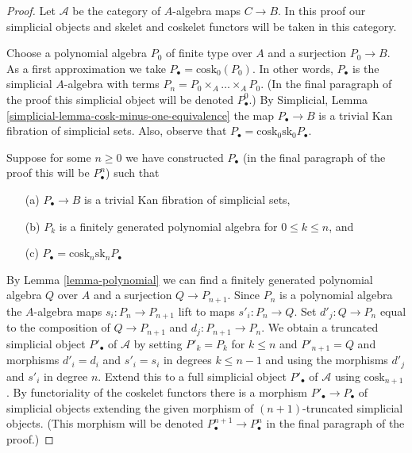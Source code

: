 \begin{proof}
Let $\mathcal{A}$ be the category of $A$-algebra maps $C \to B$.
In this proof our simplicial objects and skelet and coskelet
functors will be taken in this category.

\medskip\noindent
Choose a polynomial algebra $P_0$ of finite type over $A$ and a surjection
$P_0 \to B$. As a first approximation we take
$P_\bullet = \text{cosk}_0(P_0)$. In other words, $P_\bullet$ is the simplicial
$A$-algebra with terms $P_n = P_0 \times_A \ldots \times_A P_0$.
(In the final paragraph of the proof this simplicial object will
be denoted $P^0_\bullet$.) By
Simplicial, Lemma \ref{simplicial-lemma-cosk-minus-one-equivalence}
the map $P_\bullet \to B$ is a trivial Kan fibration of simplicial sets.
Also, observe that $P_\bullet = \text{cosk}_0 \text{sk}_0 P_\bullet$.

\medskip\noindent
Suppose for some $n \geq 0$ we have constructed $P_\bullet$
(in the final paragraph of the proof this will be $P^n_\bullet$)
such that
\begin{enumerate}
\item[(a)] $P_\bullet \to B$ is a trivial Kan fibration of simplicial sets,
\item[(b)] $P_k$ is a finitely generated polynomial algebra for
$0 \leq k \leq n$, and
\item[(c)] $P_\bullet = \text{cosk}_n \text{sk}_n P_\bullet$
\end{enumerate}
By Lemma \ref{lemma-polynomial}
we can find a finitely generated polynomial algebra $Q$ over $A$
and a surjection $Q \to P_{n + 1}$. Since $P_n$ is a polynomial algebra
the $A$-algebra maps $s_i : P_n \to P_{n + 1}$ lift to maps
$s'_i : P_n \to Q$. Set $d'_j : Q \to P_n$ equal to the composition of
$Q \to P_{n + 1}$ and $d_j : P_{n + 1} \to P_n$.
We obtain a truncated simplicial object $P'_\bullet$ of $\mathcal{A}$
by setting $P'_k = P_k$ for $k \leq n$ and $P'_{n + 1} = Q$ and morphisms
$d'_i = d_i$ and $s'_i = s_i$ in degrees $k \leq n - 1$ and using the
morphisms $d'_j$ and $s'_i$ in degree $n$. Extend this to a full simplicial
object $P'_\bullet$ of $\mathcal{A}$ using $\text{cosk}_{n + 1}$. By
functoriality of the coskelet functors there is a morphism
$P'_\bullet \to P_\bullet$ of simplicial objects extending the
given morphism of $(n + 1)$-truncated simplicial objects.
(This morphism will be denoted $P^{n + 1}_\bullet \to P^n_\bullet$
in the final paragraph of the proof.)


\end{proof}

